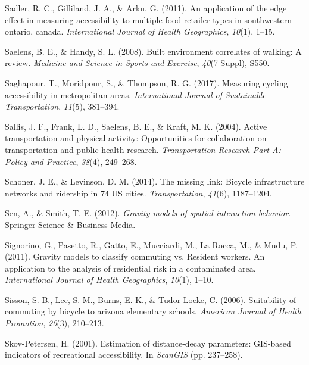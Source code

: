 \documentclass[12pt,twoside]{reedthesis}
\newlength{\cslhangindent}
\newenvironment{CSLReferences}[2] %
 {%
  \setlength{\parindent}{0pt}
  \ifodd #1 \everypar{\setlength{\hangindent}{\cslhangindent}}\ignorespaces\fi
  \ifnum #2 > 0
  \setlength{\parskip}{#2\baselineskip}
  \fi
 }%
 {}
\begin{document}
\begin{CSLReferences}{1}{0}
\leavevmode{}%
Sadler, R. C., Gilliland, J. A., \& Arku, G. (2011). An application of the edge effect in measuring accessibility to multiple food retailer types in southwestern ontario, canada. \emph{International Journal of Health Geographics}, \emph{10}(1), 1--15.

\leavevmode{}%
Saelens, B. E., \& Handy, S. L. (2008). Built environment correlates of walking: A review. \emph{Medicine and Science in Sports and Exercise}, \emph{40}(7 Suppl), S550.

\leavevmode{}%
Saghapour, T., Moridpour, S., \& Thompson, R. G. (2017). Measuring cycling accessibility in metropolitan areas. \emph{International Journal of Sustainable Transportation}, \emph{11}(5), 381--394.

\leavevmode{}%
Sallis, J. F., Frank, L. D., Saelens, B. E., \& Kraft, M. K. (2004). Active transportation and physical activity: Opportunities for collaboration on transportation and public health research. \emph{Transportation Research Part A: Policy and Practice}, \emph{38}(4), 249--268.

\leavevmode{}%
Schoner, J. E., \& Levinson, D. M. (2014). The missing link: Bicycle infrastructure networks and ridership in 74 US cities. \emph{Transportation}, \emph{41}(6), 1187--1204.

\leavevmode{}%
Sen, A., \& Smith, T. E. (2012). \emph{Gravity models of spatial interaction behavior}. Springer Science \& Business Media.

\leavevmode{}%
Signorino, G., Pasetto, R., Gatto, E., Mucciardi, M., La Rocca, M., \& Mudu, P. (2011). Gravity models to classify commuting vs. Resident workers. An application to the analysis of residential risk in a contaminated area. \emph{International Journal of Health Geographics}, \emph{10}(1), 1--10.

\leavevmode{}%
Sisson, S. B., Lee, S. M., Burns, E. K., \& Tudor-Locke, C. (2006). Suitability of commuting by bicycle to arizona elementary schools. \emph{American Journal of Health Promotion}, \emph{20}(3), 210--213.

\leavevmode{}%
Skov-Petersen, H. (2001). Estimation of distance-decay parameters: GIS-based indicators of recreational accessibility. In \emph{ScanGIS} (pp. 237--258).


\end{CSLReferences}
\end{document}
